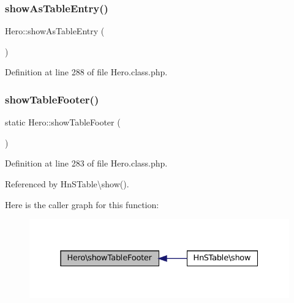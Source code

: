 \subsubsection{\texorpdfstring{show\+As\+Table\+Entry()}{showAsTableEntry()}}
{\footnotesize\ttfamily Hero\+::show\+As\+Table\+Entry (\begin{DoxyParamCaption}{ }\end{DoxyParamCaption})}



Definition at line 288 of file Hero.\+class.\+php.

\mbox{\label{class_hero_a811e2707d4416d4f7186315a53c545d6}} 
\subsubsection{\texorpdfstring{show\+Table\+Footer()}{showTableFooter()}}
{\footnotesize\ttfamily static Hero\+::show\+Table\+Footer (\begin{DoxyParamCaption}{ }\end{DoxyParamCaption})\hspace{0.3cm}{\ttfamily [static]}}



Definition at line 283 of file Hero.\+class.\+php.



Referenced by Hn\+S\+Table\textbackslash{}show().

Here is the caller graph for this function\+:\nopagebreak
\begin{figure}[H]
\begin{center}
\leavevmode
\includegraphics[width=331pt]{class_hero_a811e2707d4416d4f7186315a53c545d6_icgraph}
\end{center}
\end{figure}
\mbox{\label{class_hero_a60b7fc5e4c44832919909e172c309c4b}} 
